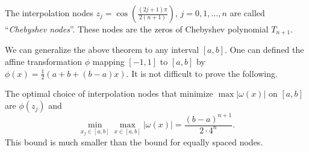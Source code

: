 \begin{definition}
    The interpolation nodes $z_j = \cos(\frac{(2j+1)\pi}{2(n+1)})$, $j = 0, 1, \dots, n$ are called ``\textit{Chebyshev nodes}''. These nodes are the zeros of Chebyshev polynomial $T_{n+1}$.
\end{definition}
We can generalize the above theorem to any interval $[a, b]$. One can defined the affine transformation $\phi$ mapping $[-1,1]$ to $[a, b]$ by $\phi(x) = \frac{1}{2} (a + b + (b-a)x)$. It is not difficult to prove the following.
\begin{corollary}
\label{Cor: 2-Che-err-any}
    The optimal choice of interpolation nodes that minimize $\max |\omega(x)|$ on $[a, b]$ are $\phi(z_j)$ and 
   $$\min_{x_j\in [a, b]} \max_{x\in [a, b]} |\omega(x)| = \frac{(b-a)^{n+1}}{2\cdot 4^n}.$$
   This bound is much smaller than the bound for equally spaced nodes.
\end{corollary}

